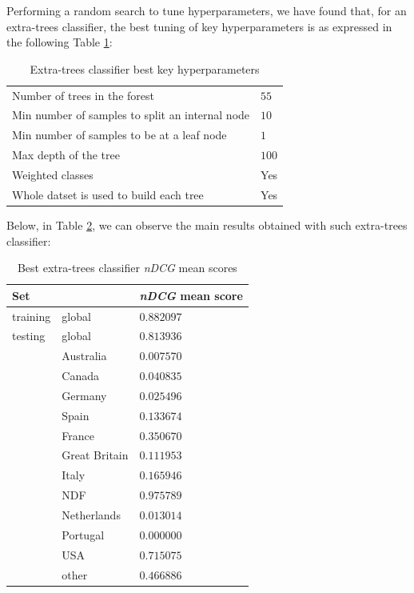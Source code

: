 \documentclass[twocolumn, switch]{article}
\begin{document}
Performing a random search to tune hyperparameters, we have found that, for an extra-trees classifier, the best tuning of key hyperparameters is as expressed in the following Table \ref{tab:etchyp}:

\begin{table}[H]
\caption{Extra-trees classifier best key hyperparameters}
\centering
\begin{tabular}{ll}
\toprule
Number of trees in the forest & $55$ \\
Min number of samples to split an internal node & $10$ \\
Min number of samples to be at a leaf node & $1$ \\
Max depth of the tree & $100$ \\
Weighted classes & Yes \\
Whole datset is used to build each tree & Yes \\
\bottomrule
\end{tabular}
\label{tab:etchyp}
\end{table}

Below, in Table \ref{tab:etc}, we can observe the main results obtained with such extra-trees classifier:

\begin{table}[H]
\caption{Best extra-trees classifier \textit{nDCG} mean scores}
\centering
\begin{tabular}{lll}
\toprule
Set & & \textit{nDCG} mean score \\
\midrule
training & global & $0.882097$ \\
testing & global & $0.813936$ \\
& Australia & $0.007570$ \\
& Canada & $0.040835$ \\
& Germany & $0.025496$ \\
& Spain & $0.133674$ \\
& France & $0.350670$ \\
& Great Britain & $0.111953$ \\
& Italy & $0.165946$ \\
& NDF & $0.975789$ \\
& Netherlands & $0.013014$ \\
& Portugal & $0.000000$ \\
& USA & $0.715075$ \\
& other & $0.466886$ \\
\bottomrule
\end{tabular}
\label{tab:etc}
\end{table}
\end{document}
